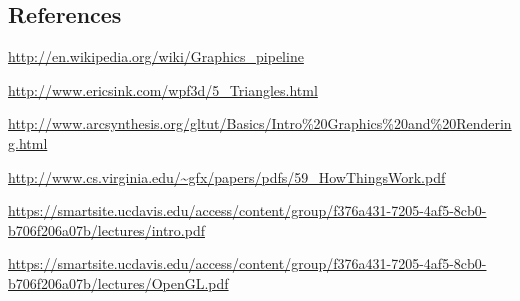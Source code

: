 \documentclass[12pt] {article}
\begin{document}
\clearpage
\subsection{References}

\url{	http://en.wikipedia.org/wiki/Graphics_pipeline}

\url{http://www.ericsink.com/wpf3d/5_Triangles.html}

\url{http://www.arcsynthesis.org/gltut/Basics/Intro%20Graphics%20and%20Rendering.html}

\url{http://www.cs.virginia.edu/~gfx/papers/pdfs/59_HowThingsWork.pdf}

\url{https://smartsite.ucdavis.edu/access/content/group/f376a431-7205-4af5-8cb0-b706f206a07b/lectures/intro.pdf}

\url{https://smartsite.ucdavis.edu/access/content/group/f376a431-7205-4af5-8cb0-b706f206a07b/lectures/OpenGL.pdf}
\end{document}
